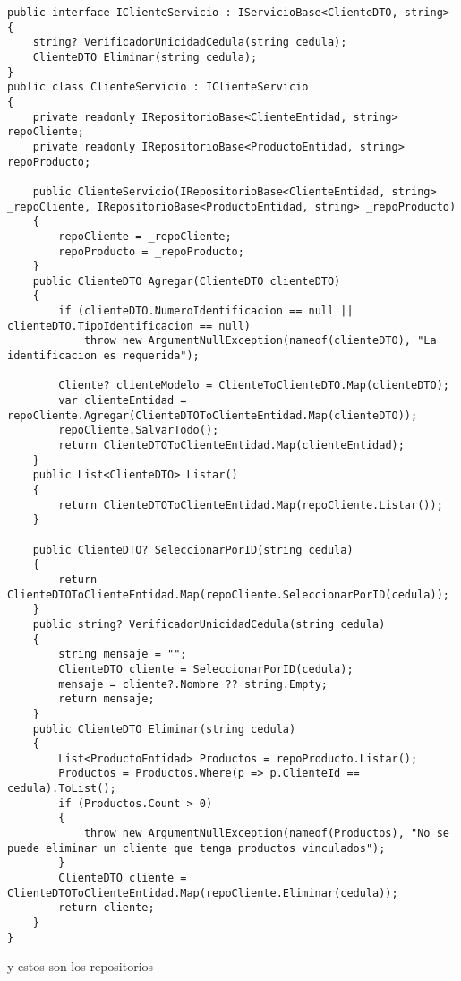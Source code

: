 \documentclass[executivepaper]{article}
\begin{document}
\begin{lstlisting}
public interface IClienteServicio : IServicioBase<ClienteDTO, string>
{
    string? VerificadorUnicidadCedula(string cedula);
    ClienteDTO Eliminar(string cedula);
}
public class ClienteServicio : IClienteServicio
{
    private readonly IRepositorioBase<ClienteEntidad, string> repoCliente;
    private readonly IRepositorioBase<ProductoEntidad, string> repoProducto;

    public ClienteServicio(IRepositorioBase<ClienteEntidad, string> _repoCliente, IRepositorioBase<ProductoEntidad, string> _repoProducto)
    {
        repoCliente = _repoCliente;
        repoProducto = _repoProducto;
    }
    public ClienteDTO Agregar(ClienteDTO clienteDTO)
    {
        if (clienteDTO.NumeroIdentificacion == null || clienteDTO.TipoIdentificacion == null)
            throw new ArgumentNullException(nameof(clienteDTO), "La identificacion es requerida");

        Cliente? clienteModelo = ClienteToClienteDTO.Map(clienteDTO);
        var clienteEntidad = repoCliente.Agregar(ClienteDTOToClienteEntidad.Map(clienteDTO));
        repoCliente.SalvarTodo();
        return ClienteDTOToClienteEntidad.Map(clienteEntidad);
    }
    public List<ClienteDTO> Listar()
    {
        return ClienteDTOToClienteEntidad.Map(repoCliente.Listar());
    }

    public ClienteDTO? SeleccionarPorID(string cedula)
    {
        return ClienteDTOToClienteEntidad.Map(repoCliente.SeleccionarPorID(cedula));
    }
    public string? VerificadorUnicidadCedula(string cedula)
    {
        string mensaje = "";
        ClienteDTO cliente = SeleccionarPorID(cedula);
        mensaje = cliente?.Nombre ?? string.Empty;
        return mensaje;
    }
    public ClienteDTO Eliminar(string cedula)
    {
        List<ProductoEntidad> Productos = repoProducto.Listar();
        Productos = Productos.Where(p => p.ClienteId == cedula).ToList();
        if (Productos.Count > 0)
        {
            throw new ArgumentNullException(nameof(Productos), "No se puede eliminar un cliente que tenga productos vinculados");
        }
        ClienteDTO cliente = ClienteDTOToClienteEntidad.Map(repoCliente.Eliminar(cedula));
        return cliente;
    }
}
\end{lstlisting}

y estos son los repositorios
\end{document}
